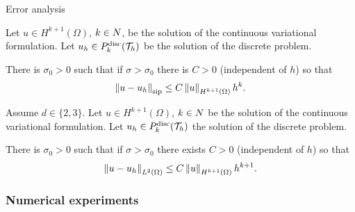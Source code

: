 \begin{frame}{Error analysis}
\small
\begin{theorem}
	\label{theorem:eliptico_orden_norma_SIP}
	Let $u\in H^{k+1}(\Omega)$, $k\in\relax N$, be the solution of the continuous variational formulation. Let $u_h\in\relax{P}^{\text{disc}}_k(\mathcal{T}_h)$ be the solution of the discrete problem.
	
	There is $\sigma_0>0$ such that if $\sigma>\sigma_0$ there is $C>0$ (independent of $h$) so that $$\left\|u-u_h\right\|_{\text{sip}}\leq C\left\|u\right\|_{H^{k+1}(\Omega)}h^k.$$
\end{theorem}

%	

\begin{theorem}
	\label{corolario:eliptico_orden_norma_L2}
	Assume $d\in\{2,3\}$. Let $u\in H^{k+1}(\Omega)$, $k\in\relax N$ be the solution of the continuous variational formulation. Let $u_h\in\relax{P}^{\text{disc}}_k(\mathcal{T}_h)$ the solution of the discrete problem.
	
	There is $\sigma_0>0$ such that if $\sigma>\sigma_0$ there exists $C>0$ (independent of $h$) so that $$\left\|u-u_h\right\|_{L^2(\Omega)}\leq C\left\|u\right\|_{H^{k+1}(\Omega)}h^{k+1}.$$
\end{theorem}
\end{frame}

	\subsubsection{Numerical experiments}

